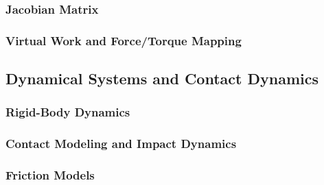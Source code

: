     \subsubsection{Jacobian Matrix}
    \subsubsection{Virtual Work and Force/Torque Mapping}

\subsection{Dynamical Systems and Contact Dynamics}
    \subsubsection{Rigid-Body Dynamics}
    \subsubsection{Contact Modeling and Impact Dynamics}
    \subsubsection{Friction Models}
